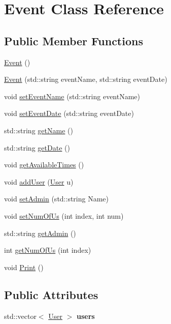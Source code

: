 \hypertarget{class_event}{}\section{Event Class Reference}
\label{class_event}
\subsection*{Public Member Functions}
\begin{DoxyCompactItemize}
\item 
\mbox{\hyperlink{class_event_a5a40dd4708297f7031e29b39e039ae10}{Event}} ()
\item 
\mbox{\hyperlink{class_event_adcbdd318d0c3237e2e829549fd426d70}{Event}} (std\+::string event\+Name, std\+::string event\+Date)
\item 
void \mbox{\hyperlink{class_event_a4c6829c10c6c865759221d57a0f4a64f}{set\+Event\+Name}} (std\+::string event\+Name)
\item 
void \mbox{\hyperlink{class_event_a0fbbd58ef1341dfacea38de7795d3667}{set\+Event\+Date}} (std\+::string event\+Date)
\item 
std\+::string \mbox{\hyperlink{class_event_adf0f3e50061123d6f24200661eeb66eb}{get\+Name}} ()
\item 
std\+::string \mbox{\hyperlink{class_event_a1fb318a969eaf352d3f507b8097bd810}{get\+Date}} ()
\item 
void \mbox{\hyperlink{class_event_a099c123993ee717521ec411838d0f719}{get\+Available\+Times}} ()
\item 
void \mbox{\hyperlink{class_event_a6cf708e6ba961e2392716dd2c53d7938}{add\+User}} (\mbox{\hyperlink{class_user}{User}} u)
\item 
void \mbox{\hyperlink{class_event_aec0fa6f68332424cdfb15855765cadf3}{set\+Admin}} (std\+::string Name)
\item 
void \mbox{\hyperlink{class_event_ab573b9da583f00cd5d60934fb594e1ac}{set\+Num\+Of\+Us}} (int index, int num)
\item 
std\+::string \mbox{\hyperlink{class_event_a61903b21fd660d7ddaa126dab671a756}{get\+Admin}} ()
\item 
int \mbox{\hyperlink{class_event_a00e5f70b33801f1081ccc434a276aca5}{get\+Num\+Of\+Us}} (int index)
\item 
void \mbox{\hyperlink{class_event_a8087f742c473db50d2dda834de64ad1f}{Print}} ()
\end{DoxyCompactItemize}
\subsection*{Public Attributes}
\begin{DoxyCompactItemize}
\item 
\mbox{\label{class_event_a78deb5cb4ee864c9ef6a90db2ad4eeab}} 
std\+::vector$<$ \mbox{\hyperlink{class_user}{User}} $>$ {\bfseries users}
\end{DoxyCompactItemize}


